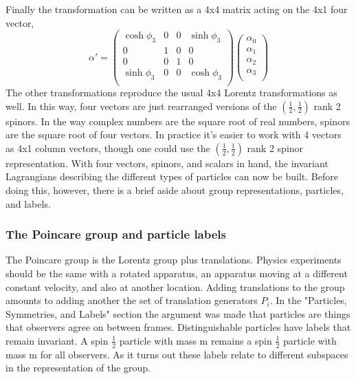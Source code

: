 Finally the transformation can be written as a 4x4 matrix acting on the 4x1 four vector,
\begin{equation}
\alpha' = 
\begin{pmatrix}
\cosh\phi_3 & 0 & 0 & \sinh\phi_3 \\
0 & 1 & 0 & 0 \\
0 & 0 & 1 & 0 \\
\sinh\phi_3 & 0 & 0 & \cosh\phi_3 \\
\end{pmatrix}
\begin{pmatrix}
\alpha_0 \\
\alpha_1 \\
\alpha_2 \\
\alpha_3 \\
\end{pmatrix}
\end{equation}
The other transformations reproduce the usual 4x4 Lorentz transformations as well. In this way, four vectors are just rearranged versions of the $(\frac{1}{2}, \frac{1}{2})$ rank 2 spinors. In the way complex numbers are the square root of real numbers, spinors are the square root of four vectors. In practice it's easier to work with 4 vectors as 4x1 column vectors, though one could use the $(\frac{1}{2}, \frac{1}{2})$ rank 2 spinor representation. With four vectors, spinors, and scalars in hand, the invariant Lagrangians describing the different types of particles can now be built. Before doing this, however, there is a brief aside about group representations, particles, and labels.

\subsubsection{The Poincare group and particle labels}

The Poincare group is the Lorentz group plus translations. Physics experiments should be the same with a rotated apparatus, an apparatus moving at a different constant velocity, and also at another location. Adding translations to the group amounts to adding another the set of translation generators $P_i$. In the "Particles, Symmetries, and Labels" section the argument was made that particles are things that observers agree on between frames. Distinguishable particles have labels that remain invariant. A spin $\frac{1}{2}$ particle with mass m remains a spin $\frac{1}{2}$ particle with mass m for all observers. As it turns out these labels relate to different subspaces in the representation of the group.

